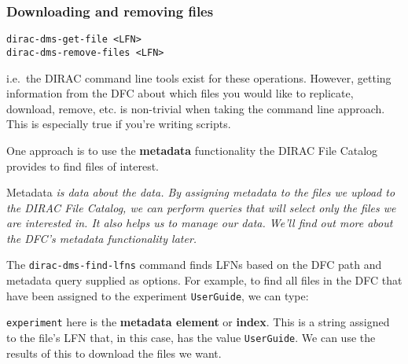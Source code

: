 \subsubsection{Downloading and removing files}
\label{downloading-and-removing-files-tools}

\begin{verbatim}
dirac-dms-get-file <LFN>
dirac-dms-remove-files <LFN>
\end{verbatim}

i.e.~the DIRAC command line tools exist for these operations. However,
getting information from the DFC about which files you would like to
replicate, download, remove, etc. is non-trivial when taking the command
line approach. This is especially true if you're writing scripts.

One approach is to use the \textbf{metadata} functionality the DIRAC
File Catalog provides to find files of interest.

\begin{infobox}{Metadata}
 \emph{is data about the data. By assigning metadata to the files we
upload to the DIRAC File Catalog, we can perform queries that will
select only the files we are interested in. It also helps us to manage
our data. We'll find out more about the DFC's metadata functionality
later.}
\end{infobox}

The \texttt{dirac-dms-find-lfns} command finds LFNs based on the DFC
path and metadata query supplied as options. For example, to find all
files in the DFC that have been assigned to the experiment
\texttt{UserGuide}, we can type:

\begin{Shaded}
\begin{Highlighting}[]
 
\NormalTok{\{}\NormalTok{: }\NormalTok{\}}
\end{Highlighting}
\end{Shaded}

\texttt{experiment} here is the \textbf{metadata element} or
\textbf{index}. This is a string assigned to the file's LFN that, in
this case, has the value \texttt{UserGuide}. We can use the results of
this to download the files we want.

